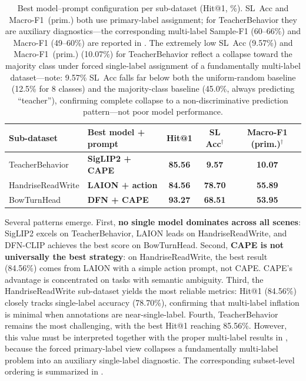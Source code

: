 \documentclass[symmetry,article,submit,pdftex,moreauthors]{Definitions/mdpi}
\begin{document}
\begin{table}[H]
\caption{Best model--prompt configuration per sub-dataset (Hit@1, \%). SL~Acc and Macro-F1~(prim.) both use primary-label assignment; for TeacherBehavior they are auxiliary diagnostics---the corresponding multi-label Sample-F1 (60--66\%) and Macro-F1 (49--60\%) are reported in . The extremely low SL~Acc (9.57\%) and Macro-F1~(prim.) (10.07\%) for TeacherBehavior reflect a collapse toward the majority class under forced single-label assignment of a fundamentally multi-label dataset---note: 9.57\% SL~Acc falls far below both the uniform-random baseline (12.5\% for 8 classes) and the majority-class baseline (45.0\%, always predicting ``teacher''), confirming complete collapse to a non-discriminative prediction pattern---not poor model performance.}
\label{tab:best_per_dataset}
\centering
\small
\begin{tabular}{llccc}
\toprule
\textbf{Sub-dataset} & \textbf{Best model + prompt} & \textbf{Hit@1} & \textbf{SL Acc$^{\dagger}$} & \textbf{Macro-F1 (prim.)$^{\dagger}$} \\
\midrule
TeacherBehavior & \textbf{SigLIP2 + CAPE} & \textbf{85.56} & \textbf{9.57} & \textbf{10.07} \\
HandriseReadWrite & \textbf{LAION + action} & \textbf{84.56} & \textbf{78.70} & \textbf{55.89} \\
BowTurnHead & \textbf{DFN + CAPE} & \textbf{93.27} & \textbf{68.51} & \textbf{53.95} \\
\bottomrule
\end{tabular}
\end{table}

Several patterns emerge.
First, \textbf{no single model dominates across all scenes}: SigLIP2 excels on TeacherBehavior, LAION leads on HandriseReadWrite, and DFN-CLIP achieves the best score on BowTurnHead.
Second, \textbf{CAPE is not universally the best strategy}: on HandriseReadWrite, the best result (84.56\%) comes from LAION with a simple action prompt, not CAPE. CAPE's advantage is concentrated on tasks with semantic ambiguity.
Third, the HandriseReadWrite sub-dataset yields the most reliable metrics: Hit@1 (84.56\%) closely tracks single-label accuracy (78.70\%), confirming that multi-label inflation is minimal when annotations are near-single-label.
Fourth, TeacherBehavior remains the most challenging, with the best Hit@1 reaching 85.56\%. However, this value must be interpreted together with the proper multi-label results in , because the forced primary-label view collapses a fundamentally multi-label problem into an auxiliary single-label diagnostic.
The corresponding subset-level ordering is summarized in .
\end{document}
